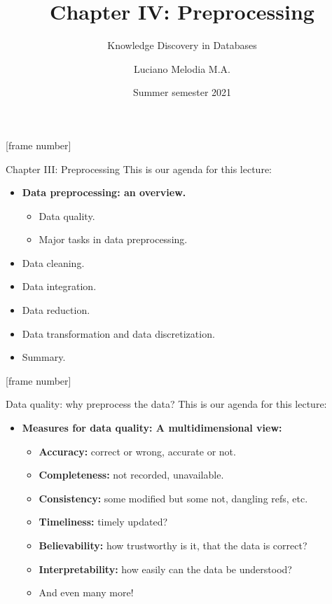 \documentclass[aspectratio=169,t]{beamer}
\title[KDD]{Chapter IV: Preprocessing}
\subtitle{Knowledge Discovery in Databases}
\author[L.~Melodia]{Luciano Melodia M.A.}
\institute[Department]{Evolutionary Data Management, Friedrich-Alexander University Erlangen-Nürnberg}
\date{Summer semester 2021}
\begin{document}
  \maketitle

  {
    [frame number]
    \begin{frame}{Chapter III: Preprocessing}
    This is our agenda for this lecture:
        \begin{itemize}
            \item \textbf{Data preprocessing: an overview.}
            \begin{itemize}
              \item Data quality.
              \item Major tasks in data preprocessing.
            \end{itemize}
            \item Data cleaning.
            \item Data integration.
            \item Data reduction.
            \item Data transformation and data discretization.
            \item Summary.
        \end{itemize}
    \end{frame}
  }

  {
    [frame number]
    \begin{frame}{Data quality: why preprocess the data?}
    This is our agenda for this lecture:
        \begin{itemize}
            \item \textbf{Measures for {\color{airforceblue}data quality}: A multidimensional view:}
            \begin{itemize}
              \item \textbf{Accuracy:} correct or wrong, accurate or not.
              \item \textbf{Completeness:} not recorded, unavailable.
              \item \textbf{Consistency:} some modified but some not, dangling refs, etc.
              \item \textbf{Timeliness:} timely updated?
              \item \textbf{Believability:} how trustworthy is it, that the data is correct?
              \item \textbf{Interpretability:} how easily can the data be understood?
              \item And even many more!
            \end{itemize}
        \end{itemize}
    \end{frame}
  }
\end{document}
